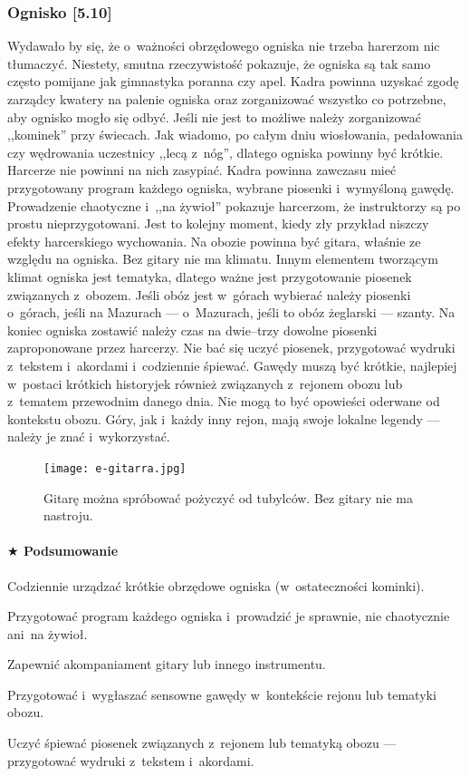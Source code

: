 \documentclass[a5paper,10pt,titlepage,twoside]{article}
\newcommand*{\thecheckbox}{\hss$\Box$} %
\newenvironment*{checklist}
{\list{}{%
\renewcommand*{\makelabel}[1]{\thecheckbox}}}
{\endlist}
\begin{document}
\subsubsection{Ognisko [5.10]}
Wydawało by się, że o~ważności obrzędowego ogniska nie trzeba harerzom nic tłumaczyć. Niestety, smutna rzeczywistość pokazuje, że ogniska są tak samo często pomijane jak gimnastyka poranna czy apel. Kadra powinna uzyskać zgodę zarządcy kwatery na palenie ogniska oraz zorganizować wszystko co potrzebne, aby ognisko mogło się odbyć. Jeśli nie jest to możliwe należy zorganizować ,,kominek'' przy świecach. Jak wiadomo, po całym dniu wiosłowania, pedałowania czy wędrowania uczestnicy ,,lecą z~nóg'', dlatego ogniska powinny być krótkie. Harcerze nie powinni na nich zasypiać. Kadra powinna zawczasu mieć przygotowany program każdego ogniska, wybrane piosenki i~wymyśloną gawędę. Prowadzenie chaotyczne i~,,na żywioł'' pokazuje harcerzom, że instruktorzy są po prostu nieprzygotowani. Jest to kolejny moment, kiedy zły przykład niszczy efekty harcerskiego wychowania. Na obozie powinna być gitara, właśnie ze względu na ogniska. Bez gitary nie ma klimatu. Innym elementem tworzącym klimat ogniska jest tematyka, dlatego ważne jest przygotowanie piosenek związanych z~obozem. Jeśli obóz jest w~górach wybierać należy piosenki o~górach, jeśli na Mazurach --- o~Mazurach, jeśli to obóz żeglarski --- szanty. Na koniec ogniska zostawić należy czas na dwie--trzy dowolne piosenki zaproponowane przez harcerzy. Nie bać się uczyć piosenek, przygotować wydruki z~tekstem i~akordami i~codziennie śpiewać. Gawędy muszą być krótkie, najlepiej w~postaci krótkich historyjek również związanych z~rejonem obozu lub z~tematem przewodnim danego dnia. Nie mogą to być opowieści oderwane od kontekstu obozu. Góry, jak i~każdy inny rejon, mają swoje lokalne legendy --- należy je znać i~wykorzystać.
\begin{figure}[htp]
\centering
\texttt{[image: e-gitarra.jpg]}
\caption{Gitarę można spróbować pożyczyć od tubylców. Bez gitary nie ma nastroju.}\label{fig:e-gitarra}
\end{figure}
\paragraph{$\bigstar$ Podsumowanie}
\begin{checklist}
\item Codziennie urządzać krótkie obrzędowe ogniska (w~ostateczności kominki).
\item Przygotować program każdego ogniska i~prowadzić je sprawnie, nie chaotycznie ani~na żywioł.
\item Zapewnić akompaniament gitary lub innego instrumentu.
\item Przygotować i~wygłaszać sensowne gawędy w~kontekście rejonu lub tematyki obozu.
\item Uczyć śpiewać piosenek związanych z~rejonem lub tematyką obozu --- przygotować wydruki z~tekstem i~akordami.
\end{checklist}
\end{document}
